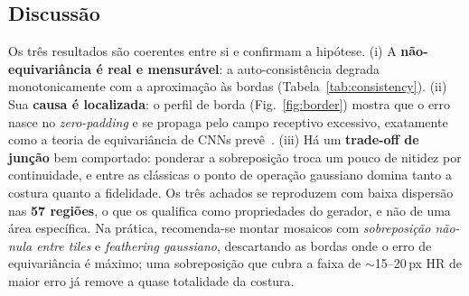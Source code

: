 \documentclass[conference]{IEEEtran}
\begin{document}
\subsection{Discussão}
Os três resultados são coerentes entre si e confirmam a hipótese. (i) A
\textbf{não-equivariância é real e mensurável}: a auto-consistência degrada
monotonicamente com a aproximação às bordas (Tabela~\ref{tab:consistency}). (ii) Sua
\textbf{causa é localizada}: o perfil de borda (Fig.~\ref{fig:border}) mostra que o erro
nasce no \textit{zero-padding} e se propaga pelo campo receptivo excessivo, exatamente
como a teoria de equivariância de CNNs prevê~\cite{b_shiftinv}. (iii) Há um
\textbf{trade-off de junção} bem comportado: ponderar a sobreposição troca um pouco de
nitidez por continuidade, e entre as clássicas o ponto de operação gaussiano domina tanto
a costura quanto a fidelidade. Os três achados se reproduzem com baixa dispersão nas
\textbf{57 regiões}, o que os qualifica como propriedades do gerador, e não de uma área
específica. Na prática, recomenda-se montar mosaicos com \emph{sobreposição
não-nula entre tiles} e \emph{feathering gaussiano}, descartando as bordas onde o erro
de equivariância é máximo; uma sobreposição que cubra a faixa de $\sim$15--20\,px HR de
maior erro já remove a quase totalidade da costura.
\end{document}
